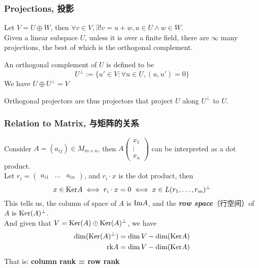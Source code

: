 \subsubsection{Projections, 投影}
Let $V = U \oplus W$, then $\forall v \in V, \exists ! v = u + w, u \in U \land w \in W$. \\
Given a linear subspace $U$, unless it is over a finite field, there are $\infty$ many projections, the best of which is the orthogonal complement.
\begin{definition}
    An orthogonal complement of $U$ is defined to be
    $$U^\perp := \{u' \in V: \forall u \in U, (u, u') = 0\}$$
    We have $U \oplus U^\perp = V$
\end{definition}
Orthogonal projectors are thus projectors that project $U$ along $U^\perp$ to $U$.

\subsubsection{Relation to Matrix, 与矩阵的关系}
Consider $A = (a_{ij}) \in M_{m \times n}$, then $A \begin{pmatrix}
    x_1 \\
    \vdots \\
    x_n
\end{pmatrix}$ can be interpreted as a dot product. \\
Let $r_i = \begin{pmatrix}
    a_{i1} & \dots & a_{in}
\end{pmatrix}$, and $r_i \cdot x$ is the dot product, then
$$x \in \text{Ker} A \iff r_i \cdot x = 0 \iff x \in L(r_1, \dots, r_m)^\perp$$
This tells us, the column of space of $A$ is $\text{Im} A$, and the \textbf{\textit{row space}}（行空间）of $A$ is $\text{Ker}(A)^\perp$. \\
And given that $V = \text{Ker} (A) \oplus \text{Ker}(A)^\perp$, we have
\begin{align*}
    \dim(\text{Ker}(A)^\perp) &= \dim V - \dim(\text{Ker} A) \\
    \text{rk} A &= \dim V - \dim(\text{Ker} A)
\end{align*}
That is: \textbf{column rank = row rank}

